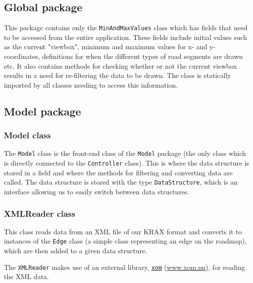 \documentclass[a4paper,11pt]{article}
\begin{document}
\subsection{Global package} %
This package contains only the \texttt{MinAndMaxValues} class which has fields that need to be accessed from the entire application. These fields include initial values such as the current "viewbox", minimum and maximum values for x- and y-coordinates, definitions for when the different types of road segments are drawn etc. It also contains methods for checking whether or not the current viewbox results in a need for re-filtering the data to be drawn. The class is statically imported by all classes needing to access this information.

\subsection{Model package} %

\subsubsection{Model class} %
The \texttt{Model} class is the front-end class of the \texttt{Model} package (the only class which is directly connected to the \texttt{Controller} class). This is where the data structure is stored in a field and where the methods for filtering and converting data are called. The data structure is stored with the type \texttt{DataStructure}, which is an interface allowing us to easily switch between data structures.

\subsubsection{XMLReader class} %
This class reads data from an XML file of our KRAX format and converts it to instances of the \texttt{Edge} class (a simple class representing an edge on the roadmap), which are then added to a given data structure.

The \texttt{XMLReader} makes use of an external library, \href{www.xom.nu}{\texttt{xom}} (\url{www.xom.nu}), for reading the XML data.
\end{document}

